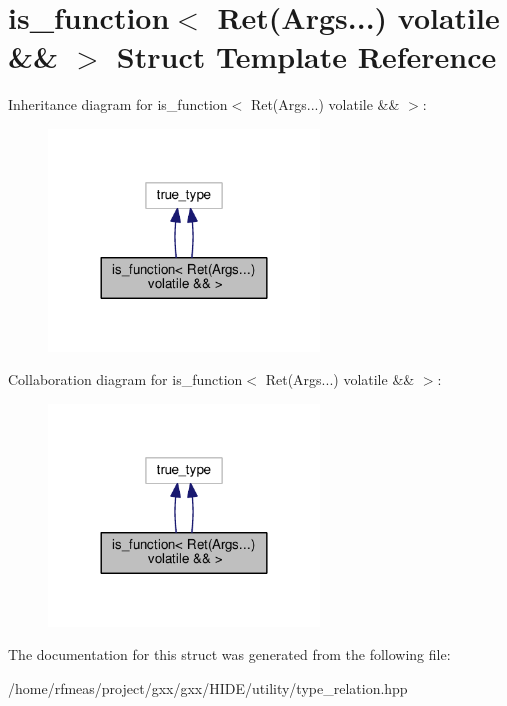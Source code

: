 \hypertarget{structis__function_3_01Ret_07Args_8_8_8_08_01volatile_01_6_6_01_4}{}\section{is\+\_\+function$<$ Ret(Args...) volatile \&\& $>$ Struct Template Reference}
\label{structis__function_3_01Ret_07Args_8_8_8_08_01volatile_01_6_6_01_4}


Inheritance diagram for is\+\_\+function$<$ Ret(Args...) volatile \&\& $>$\+:
\nopagebreak
\begin{figure}[H]
\begin{center}
\leavevmode
\includegraphics[width=204pt]{structis__function_3_01Ret_07Args_8_8_8_08_01volatile_01_6_6_01_4__inherit__graph}
\end{center}
\end{figure}


Collaboration diagram for is\+\_\+function$<$ Ret(Args...) volatile \&\& $>$\+:
\nopagebreak
\begin{figure}[H]
\begin{center}
\leavevmode
\includegraphics[width=204pt]{structis__function_3_01Ret_07Args_8_8_8_08_01volatile_01_6_6_01_4__coll__graph}
\end{center}
\end{figure}


The documentation for this struct was generated from the following file\+:\begin{DoxyCompactItemize}
\item 
/home/rfmeas/project/gxx/gxx/\+H\+I\+D\+E/utility/type\+\_\+relation.\+hpp\end{DoxyCompactItemize}
